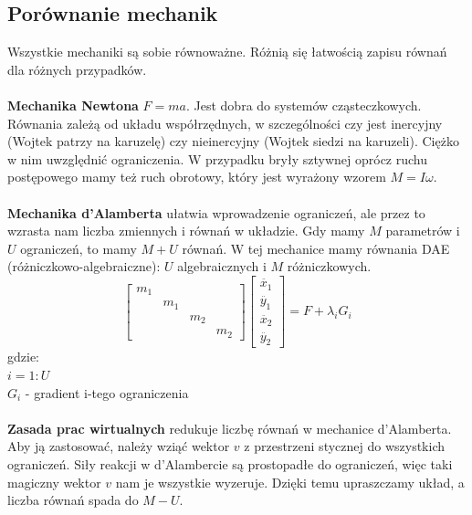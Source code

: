 \documentclass[12pt]{article}
\begin{document}
\subsection{Porównanie mechanik}
Wszystkie mechaniki są sobie równoważne. Różnią się łatwością zapisu równań dla różnych przypadków.\\
~\\
\textbf{Mechanika Newtona} $F = ma$. Jest dobra do systemów cząsteczkowych. Równania zależą od układu współrzędnych, w szczególności czy jest inercyjny (Wojtek patrzy na karuzelę) czy nieinercyjny (Wojtek siedzi na karuzeli). Ciężko w nim uwzględnić ograniczenia. W przypadku bryły sztywnej oprócz ruchu postępowego mamy też ruch obrotowy, który jest wyrażony wzorem $M = I\omega$. \\
~\\
\textbf{Mechanika d'Alamberta} ułatwia wprowadzenie ograniczeń, ale przez to wzrasta nam liczba zmiennych i równań w układzie. Gdy mamy $M$ parametrów i $U$ ograniczeń, to mamy $M + U$ równań.
W tej mechanice mamy równania DAE (różniczkowo-algebraiczne): $U$ algebraicznych i $M$ różniczkowych.
\begin{equation} 	
	\begin{bmatrix}
	m_{1}  &   &   &  
	\\[0.3em]
	  & m_{1} &  &   
	\\[0.3em]
	  &  & m_{2} &  
	  \\[0.3em]
	  &  &  & m_{2}
	\end{bmatrix}
	\begin{bmatrix}
	\ddot{x_{1}}  
	\\[0.3em]
	\ddot{y_{1}}   
	\\[0.3em]
	\ddot{x_{2}}  
	\\[0.3em]
	\ddot{y_{2}}
	\end{bmatrix}
	= F + \lambda _{i} G_{i}	
\end{equation}
gdzie: \\
$i=1:U$ \\
$G_{i}$ - gradient i-tego ograniczenia \\
~\\
\textbf{Zasada prac wirtualnych} redukuje liczbę równań w mechanice d'Alamberta. Aby ją zastosować, należy wziąć wektor $v$ z przestrzeni stycznej do wszystkich ograniczeń. Siły reakcji w d'Alambercie są prostopadłe do ograniczeń, więc taki magiczny wektor $v$ nam je wszystkie wyzeruje. Dzięki temu upraszczamy układ, a liczba równań spada do $M - U$.\\
~\\
\end{document}
